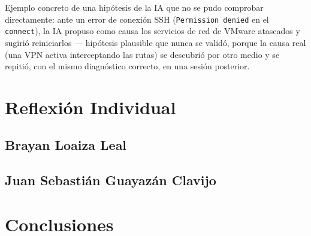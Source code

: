 \documentclass[journal]{IEEEtran}
\begin{document}
Ejemplo concreto de una hipótesis de la IA que no se pudo comprobar
directamente: ante un error de conexión SSH (\texttt{Permission denied} en
el \texttt{connect}), la IA propuso como causa los servicios de red de
VMware atascados y sugirió reiniciarlos --- hipótesis plausible que nunca se
validó, porque la causa real (una VPN activa interceptando las rutas) se
descubrió por otro medio y se repitió, con el mismo diagnóstico correcto,
en una sesión posterior.

\section*{Reflexión Individual}
\label{sec:reflexion}

\subsection*{Brayan Loaiza Leal}

\subsection*{Juan Sebastián Guayazán Clavijo}

\section{Conclusiones}
\end{document}
